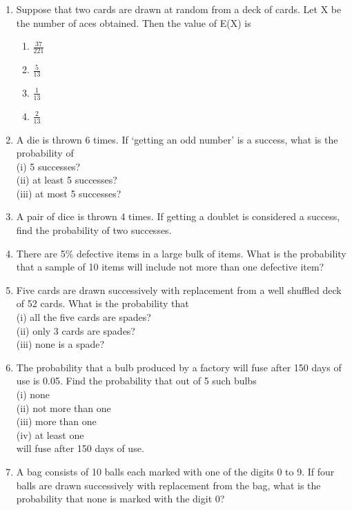 \begin{enumerate}[label=\arabic*.,ref=\thesubsection.\theenumi]
\item Suppose that two cards are drawn at random from a deck of cards. Let X be the number of aces obtained. Then the value of E(X) is\\
\begin{enumerate}
\item $\frac{37}{221}$
\item $\frac{5}{13}$
\item $\frac{1}{13}$
\item $\frac{2}{13}$
\end{enumerate}
\item A die is thrown 6 times. If ‘getting an odd number’ is a success, what is the probability of\\
(i) 5 successes?\\
(ii) at least 5 successes?\\
(iii) at most 5 successes?\\

\item A pair of dice is thrown 4 times. If getting a doublet is considered a success, find the probability of two successes.\\

\item There are 5$\%$ defective items in a large bulk of items. What is the probability
that a sample of 10 items will include not more than one defective item?\\

\item Five cards are drawn successively with replacement from a well shuffled deck of 52 cards. What is the probability that\\
(i) all the five cards are spades?\\
(ii) only 3 cards are spades?\\
(iii) none is a spade?\\

\item The probability that a bulb produced by a factory will fuse after 150 days of use
is 0.05. Find the probability that out of 5 such bulbs\\
(i) none\\
(ii) not more than one\\
(iii) more than one\\
(iv) at least one\\
will fuse after 150 days of use.\\

\item A bag consists of 10 balls each marked with one of the digits 0 to 9. If four balls are drawn successively with replacement from the bag, what is the probability that none is marked with the digit 0?\\


\end{enumerate}
